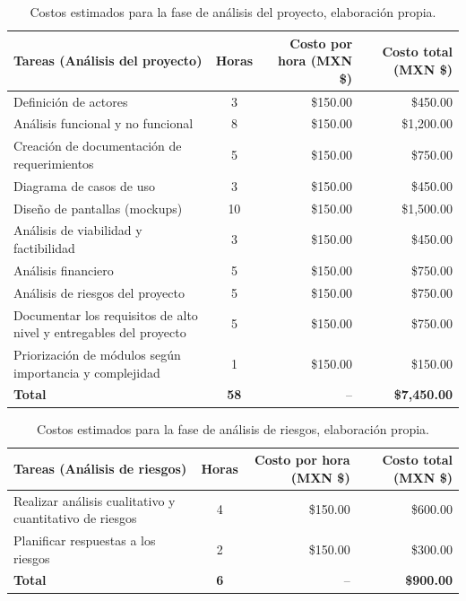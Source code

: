 \begin{table}[H]
	\centering
	\renewcommand{\arraystretch}{1.6}
	\setlength{\tabcolsep}{10pt}
	\Huge
	\begin{adjustbox}{max width=\textwidth}
		\begin{tabular}{|p{9.5cm}|c|r|r|}
			\hline
			\textbf{Tareas (Análisis del proyecto)} & \textbf{Horas} & \textbf{Costo por hora (MXN \$)} & \textbf{Costo total (MXN \$)} \\ \hline
			Definición de actores & 3 & \$150.00 & \$450.00 \\ \hline
			Análisis funcional y no funcional & 8 & \$150.00 & \$1,200.00 \\ \hline
			Creación de documentación de requerimientos & 5 & \$150.00 & \$750.00 \\ \hline
			Diagrama de casos de uso & 3 & \$150.00 & \$450.00 \\ \hline
			Diseño de pantallas (mockups) & 10 & \$150.00 & \$1,500.00 \\ \hline
			Análisis de viabilidad y factibilidad & 3 & \$150.00 & \$450.00 \\ \hline
			Análisis financiero & 5 & \$150.00 & \$750.00 \\ \hline
			Análisis de riesgos del proyecto & 5 & \$150.00 & \$750.00 \\ \hline
			Documentar los requisitos de alto nivel y entregables del proyecto & 5 & \$150.00 & \$750.00 \\ \hline
			Priorización de módulos según importancia y complejidad & 1 & \$150.00 & \$150.00 \\ \hline
			\textbf{Total} & \textbf{58} & -- & \textbf{\$7,450.00} \\ \hline
		\end{tabular}
	\end{adjustbox}
	\caption[Costos estimados para la fase de análisis del proyecto]{Costos estimados para la fase de análisis del proyecto, elaboración propia.} 	
	\label{tab:costos_analisis_nuevo}
\end{table}

\begin{table}[H]
	\centering
	\renewcommand{\arraystretch}{1.6}
	\setlength{\tabcolsep}{10pt}
	\Huge
	\begin{adjustbox}{max width=\textwidth}
		\begin{tabular}{|p{9.5cm}|c|r|r|}
			\hline
			\textbf{Tareas (Análisis de riesgos)} & \textbf{Horas} & \textbf{Costo por hora (MXN \$)} & \textbf{Costo total (MXN \$)} \\ \hline
			Realizar análisis cualitativo y cuantitativo de riesgos & 4 & \$150.00 & \$600.00 \\ \hline
			Planificar respuestas a los riesgos & 2 & \$150.00 & \$300.00 \\ \hline
			\textbf{Total} & \textbf{6} & -- & \textbf{\$900.00} \\ \hline
		\end{tabular}
	\end{adjustbox}
	\caption[Costos estimados para la fase de análisis de riesgos]{Costos estimados para la fase de análisis de riesgos, elaboración propia.} 	
	\label{tab:costos_riesgos_nuevo}
\end{table}

